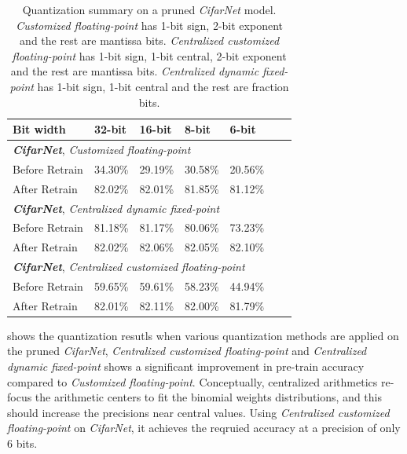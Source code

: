 \documentclass[a4paper,12pt]{report}
\begin{document}
\begin{table}[!h]
  \centering
  \begin{tabular}{lllllll}
    \hline
    \hline
    Bit width               &32-bit     &16-bit     &8-bit      &6-bit    \\
    \hline
    \hline
    \multicolumn{5}{l}{\textbf{\textit{CifarNet}}, \textit{Customized floating-point}}\\
    \hline
    Before Retrain          &34.30\%    &29.19\%    &30.58\%    &20.56\%\\
    After Retrain           &82.02\%    &82.01\%    &81.85\%    &81.12\%\\
    \hline
    \hline
    \multicolumn{5}{l}{\textbf{\textit{CifarNet}}, \textit{Centralized dynamic fixed-point}}\\
    \hline
    Before Retrain          &81.18\%    &81.17\%    &80.06\%    &73.23\%\\
    After Retrain           &82.02\%    &82.06\%    &82.05\%    &82.10\%\\
    \hline
    \hline
    \multicolumn{5}{l}{\textbf{\textit{CifarNet}}, \textit{Centralized customized floating-point}}\\
    \hline
    Before Retrain          &59.65\%    &59.61\%   &58.23\%     &44.94\%\\
    After Retrain           &82.01\%    &82.11\%   &82.00\%     &81.79\%\\
    \hline
    \hline
  \end{tabular}
  \caption{Quantization summary on a pruned \textit{CifarNet} model. \textit{Customized
  floating-point} has 1-bit sign, 2-bit exponent and the rest are mantissa bits.
  \textit{Centralized customized floating-point} has 1-bit sign, 1-bit central,
  2-bit exponent and the rest are mantissa bits.
  \textit{Centralized dynamic fixed-point} has
  1-bit sign, 1-bit central and the rest are fraction bits.}
  \label{tab:pruned_quan2}
\end{table}


 shows the quantization resutls when various
quantization methods are applied on the
pruned \textit{CifarNet}, \textit{Centralized customized floating-point}
and \textit{Centralized dynamic fixed-point} shows a significant improvement in
pre-train accuracy compared to \textit{Customized floating-point}.
Conceptually, centralized arithmetics re-focus the arithmetic centers to fit
the binomial weights distributions, and this should increase the precisions near central
values.
Using \textit{Centralized customized floating-point} on \textit{CifarNet}, it achieves the reqruied
accuracy at a precision of only $6$ bits.
\end{document}
